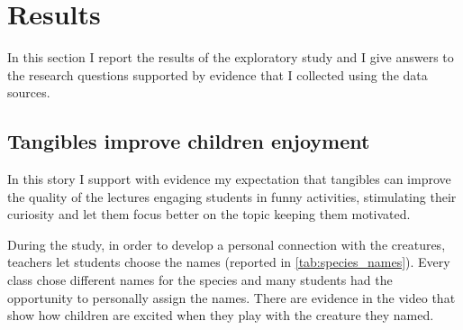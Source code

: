 \section{Results}
In this section I report the results of the exploratory study and I give answers to the research questions supported by evidence that I collected using the data sources.

\subsection{Tangibles improve children enjoyment}
In this story I support with evidence my expectation that tangibles can improve the quality of the lectures engaging students in funny activities, stimulating their curiosity and let them focus better on the topic keeping them motivated.

During the study, in order to develop a personal connection with the creatures, teachers let students choose the names (reported in \ref{tab:species_names}). Every class chose different names for the species and many students had the opportunity to personally assign the names. There are evidence in the video that show how children are excited when they play with the creature they named.

